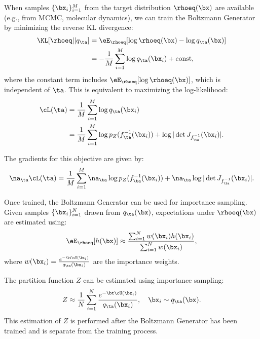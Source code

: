 When samples $\{\bx_i\}_{i=1}^M$ from the target distribution $\rhoeq(\bx)$ are available (e.g., from MCMC, molecular dynamics), we can train the Boltzmann Generator by minimizing the reverse KL divergence:
\begin{align}
    \KL[\rhoeq || q_\ta] &= \eE_{\rhoeq}[\log \rhoeq(\bx) - \log q_\ta(\bx)] \label{eq:bg_reverse_kl}\\
                         &= -\frac{1}{M} \sum_{i=1}^M \log q_\ta(\bx_i) + \text{const}, \label{eq:bg_reverse_kl_samples}
\end{align}
where the constant term includes $\eE_{\rhoeq}[\log \rhoeq(\bx)]$, which is independent of $\ta$. This is equivalent to maximizing the log-likelihood:
\begin{align}
    \cL(\ta) &= \frac{1}{M} \sum_{i=1}^M \log q_\ta(\bx_i) \label{eq:bg_mle}\\
             &= \frac{1}{M} \sum_{i=1}^M \log p_Z(f_\ta^{-1}(\bx_i)) + \log |\det J_{f_\ta^{-1}}(\bx_i)|. \label{eq:bg_mle_expanded}
\end{align}

The gradients for this objective are given by:
\begin{align}
    \na_\ta \cL(\ta) = \frac{1}{M} \sum_{i=1}^M \na_\ta \log p_Z(f_\ta^{-1}(\bx_i)) + \na_\ta \log |\det J_{f_\ta^{-1}}(\bx_i)|. \label{eq:bg_mle_gradient}
\end{align}

Once trained, the Boltzmann Generator can be used for importance sampling. Given samples $\{\bx_i\}_{i=1}^N$ drawn from $q_\ta(\bx)$, expectations under $\rhoeq(\bx)$ are estimated using:
\begin{align}
    \eE_{\rhoeq}[h(\bx)] \approx \frac{\sum_{i=1}^N w(\bx_i) h(\bx_i)}{\sum_{i=1}^N w(\bx_i)}, \label{eq:bg_importance_sampling}
\end{align}
where $w(\bx_i) = \frac{e^{-\bt \cU(\bx_i)}}{q_\ta(\bx_i)}$ are the importance weights.

The partition function $Z$ can be estimated using importance sampling:
\begin{align}
    Z \approx \frac{1}{N} \sum_{i=1}^N \frac{e^{-\bt \cU(\bx_i)}}{q_\ta(\bx_i)}, \quad \bx_i \sim q_\ta(\bx). \label{eq:bg_partition_function}
\end{align}
This estimation of $Z$ is performed after the Boltzmann Generator has been trained and is separate from the training process.